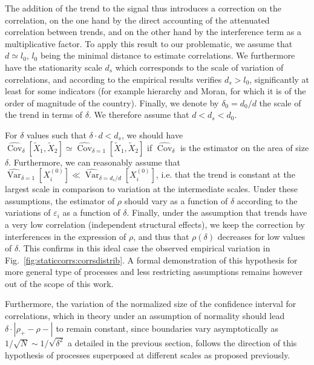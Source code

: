 \documentclass[11pt]{article}
\DeclareMathOperator{\Cov}{Cov}
\DeclareMathOperator{\Var}{Var}
\begin{document}
The addition of the trend to the signal thus introduces a correction on the correlation, on the one hand by the direct accounting of the attenuated correlation between trends, and on the other hand by the interference term as a multiplicative factor. To apply this result to our problematic, we assume that $d \simeq l_0$, $l_0$ being the minimal distance to estimate correlations. We furthermore have the stationarity scale $d_s$ which corresponds to the scale of variation of correlations, and according to the empirical results verifies $d_s > l_0$, significantly at least for some indicators (for example hierarchy and Moran, for which it is of the order of magnitude of the country). Finally, we denote by $\delta_0 = d_0/d$ the scale of the trend in terms of $\delta$. We therefore assume that $d < d_s < d_0$.

For $\delta$ values such that $\delta \cdot d < d_s$, we should have $\hat{\Cov}_{\delta}\left[\tilde{X}_1,\tilde{X}_2\right] \simeq \hat{\Cov}_{\delta = 1}\left[\tilde{X}_1,\tilde{X}_2\right]$ if $\hat{\Cov}_{\delta}$ is the estimator on the area of size $\delta$. Furthermore, we can reasonably assume that $\hat{\Var}_{\delta = 1}\left[X_i^{(0)}\right] \ll \hat{\Var}_{\delta = d_s / d}\left[X_i^{(0)}\right]$, i.e. that the trend is constant at the largest scale in comparison to variation at the intermediate scales. Under these assumptions, the estimator of $\rho$ should vary as a function of $\delta$ according to the variations of $\varepsilon_i$ as a function of $\delta$. Finally, under the assumption that trends have a very low correlation (independent structural effects), we keep the correction by interferences in the expression of $\rho$, and thus that $\rho(\delta)$ decreases for low values of $\delta$. This confirms in this ideal case the observed empirical variation in Fig.~\ref{fig:staticcorrs:corrsdistrib}. A formal demonstration of this hypothesis for more general type of processes and less restricting assumptions remains however out of the scope of this work.



Furthermore, the variation of the normalized size of the confidence interval for correlations, which in theory under an assumption of normality should lead $\delta\cdot \left|\rho_+ - \rho -\right|$ to remain constant, since boundaries vary asymptotically as $1/\sqrt{N}\sim 1/\sqrt{\delta^2}$ a detailed in the previous section, follows the direction of this hypothesis of processes superposed at different scales as proposed previously.
\end{document}
